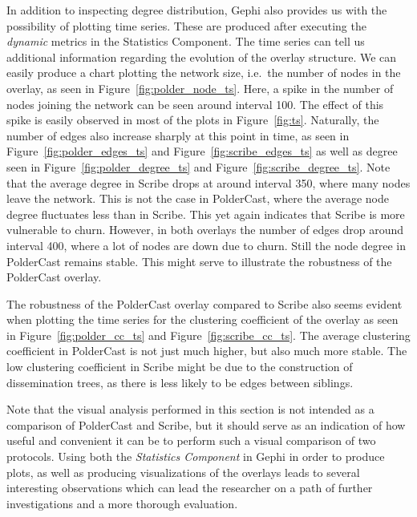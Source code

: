 In addition to inspecting degree distribution, Gephi also provides us
with the possibility of plotting time series. These are produced after
executing the \emph{dynamic} metrics in the Statistics Component.  The
time series can tell us additional information regarding the evolution
of the overlay structure. We can easily produce a chart plotting the
network size, i.e.\ the number of nodes in the overlay, as seen in
Figure~\ref{fig:polder_node_ts}.  Here, a spike in the number of nodes
joining the network can be seen around interval 100. The effect of this
spike is easily observed in most of the plots in Figure~\ref{fig:ts}.
Naturally, the number of edges also increase sharply at this point in
time, as seen in Figure~\ref{fig:polder_edges_ts} and
Figure~\ref{fig:scribe_edges_ts} as well as degree seen in
Figure~\ref{fig:polder_degree_ts} and Figure~\ref{fig:scribe_degree_ts}.
Note that the average degree in Scribe drops at around interval 350,
where many nodes leave the network. This is not the case in PolderCast,
where the average node degree fluctuates less than in Scribe. This yet
again indicates that Scribe is more vulnerable to churn. However, in
both overlays the number of edges drop around interval 400, where a lot
of nodes are down due to churn. Still the node degree in PolderCast
remains stable. This might serve to illustrate the robustness of the PolderCast overlay.

The robustness of the PolderCast overlay compared to Scribe also seems
evident when plotting the time series for the clustering coefficient of
the overlay as seen in Figure~\ref{fig:polder_cc_ts} and
Figure~\ref{fig:scribe_cc_ts}. The average clustering coefficient in
PolderCast is not just much higher, but also much more stable. The low
clustering coefficient in Scribe might be due to the construction of
dissemination trees, as there is less likely to be edges between
siblings.

Note that the visual analysis performed in this section is not intended
as a comparison of PolderCast and Scribe, but it should serve as an
indication of how useful and convenient it can be to perform such a
visual comparison of two protocols. Using both the \emph{Statistics
    Component} in Gephi in order to produce plots, as well as producing
visualizations of the overlays leads to several interesting observations
which can lead the researcher on a path of further investigations and a
more thorough evaluation.

